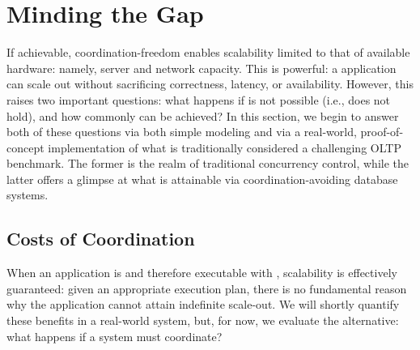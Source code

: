 
\section{Minding the Gap}
\label{sec:evaluation}

If achievable, coordination-freedom enables scalability limited to
that of available hardware: namely, server and network capacity. This
is powerful: a \cfree application can scale out without sacrificing
correctness, latency, or availability. However, this raises two
important questions: what happens if \cfreedom is not possible (i.e.,
\iconfluence does not hold), and how commonly can \cfreedom be
achieved? In this section, we begin to answer both of these questions
via both simple modeling and via a real-world, proof-of-concept
implementation of what is traditionally considered a challenging OLTP
benchmark. The former is the realm of traditional concurrency control,
while the latter offers a glimpse at what is attainable via
coordination-avoiding database systems.

\subsection{Costs of Coordination}

When an application is \iconfluent and therefore executable with
\cfreedom, scalability is effectively guaranteed: given an appropriate
execution plan, there is no fundamental reason why the application
cannot attain indefinite scale-out. We will shortly quantify these
benefits in a real-world system, but, for now, we evaluate the
alternative: what happens if a system must coordinate?

